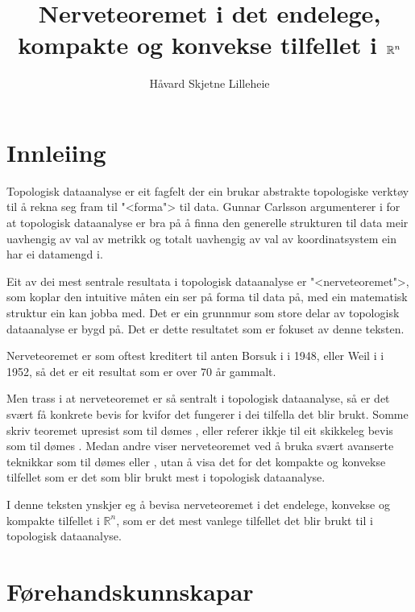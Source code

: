 \documentclass[a4paper, 12pt, norsk]{article}
\title{Nerveteoremet i det endelege, kompakte og konvekse tilfellet i \( \Rb^n \)}
\author{Håvard Skjetne Lilleheie}
\theoremstyle{plain}
\theoremstyle{definition}
\newcommand{\Rb}{\mathbb{R}}
\begin{document}
\maketitle

\tableofcontents

\newpage

\section{Innleiing} \label{sec:innleiing}

Topologisk dataanalyse er eit fagfelt der ein brukar abstrakte topologiske verktøy til å rekna seg fram til "<forma"> til data. Gunnar Carlsson argumenterer i \cite{MR2476414} for at topologisk dataanalyse er bra på å finna den generelle strukturen til data meir uavhengig av val av metrikk og totalt uavhengig av val av koordinatsystem ein har ei datamengd i.

Eit av dei mest sentrale resultata i topologisk dataanalyse er "<nerveteoremet">, som koplar den intuitive måten ein ser på forma til data på, med ein matematisk struktur ein kan jobba med. Det er ein grunnmur som store delar av topologisk dataanalyse er bygd på. Det er dette resultatet som er fokuset av denne teksten.

Nerveteoremet er som oftest kreditert til anten Borsuk i \cite{MR28019} i 1948, eller Weil i \cite{MR50280} i 1952, så det er eit resultat som er over \( 70 \) år gammalt.

Men trass i at nerveteoremet er så sentralt i topologisk dataanalyse, så er det svært få konkrete bevis for kvifor det fungerer i dei tilfella det blir brukt. Somme skriv teoremet upresist som til dømes \cite[Theorem 2.1]{MR4381505}, eller referer ikkje til eit skikkeleg bevis som til dømes \cite[Lemma 4.11]{MR3408277}. Medan andre viser nerveteoremet ved å bruka svært avanserte teknikkar som til dømes \cite[Corollary 4G.3]{MR1867354} eller \cite[Theorem 15.21]{MR2361455}, utan å visa det for det kompakte og konvekse tilfellet som er det som blir brukt mest i topologisk dataanalyse.

I denne teksten ynskjer eg å bevisa nerveteoremet i det endelege, konvekse og kompakte tilfellet i \( \Rb^n \), som er det mest vanlege tilfellet det blir brukt til i topologisk dataanalyse.

\section{Førehandskunnskapar}
\end{document}
